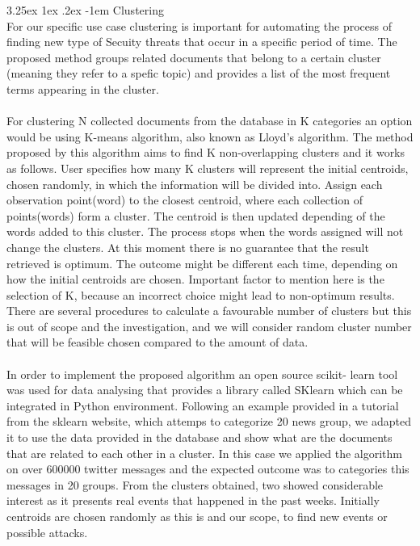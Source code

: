 \documentclass[12pt]{article}
\makeatletter
\renewcommand\paragraph{\@startsection{paragraph}{5}{\z@}%
  {3.25ex \@plus1ex \@minus.2ex}%
  {-1em}%
  {\normalfont\normalsize\bfseries}}
\makeatother
\begin{document}
\paragraph{Clustering}
\hfill \break 
\\
For our specific use case clustering is important for automating the process of finding new type of Secuity threats that occur in a specific period of time. The proposed method groups related documents that belong to a certain cluster (meaning they refer to a spefic topic) and provides a list of the most frequent terms appearing in the cluster.
\\
\\
For clustering N collected documents from the database in K categories an option would be using K-means\cite{k-means} algorithm, also known as Lloyd's algorithm. The method\cite{k-means-example} proposed by this algorithm aims to find K non-overlapping clusters and it works as follows. User specifies how many K clusters will represent the initial centroids, chosen randomly, in which the information will be divided into. Assign each observation point(word) to the closest centroid, where each collection of points(words) form a cluster. The centroid is then updated depending of the words added to this cluster. The process stops when the words assigned will not change the clusters. At this moment there is no guarantee that the result retrieved is optimum. The outcome might be different each time, depending on how the initial centroids are chosen. Important factor to mention here is the selection of K, because an incorrect choice might lead to non-optimum results. There are several procedures\cite{procedures-for-kmeans} to calculate a favourable number of clusters but this is out of scope and the investigation, and we will consider random cluster number that will be feasible chosen compared to the amount of data.
\\
\\
In order to implement the proposed algorithm an open  source scikit- learn \cite{sklearn} tool was used for data analysing that provides a library called SKlearn which can be integrated in Python environment. Following an example provided in a tutorial from the sklearn website, which attemps to categorize 20 news group\cite{k-means-20news}, we adapted it to use the data provided in the database and show what are the documents that are related to each other in a cluster.  In this case we applied the algorithm on over 600000 twitter messages and the expected outcome was to categories this messages in 20 groups. From the clusters obtained, two showed considerable interest as it presents real events that happened in the past weeks. Initially centroids are chosen randomly as this is and our scope, to find new events or possible attacks.
\end{document}
